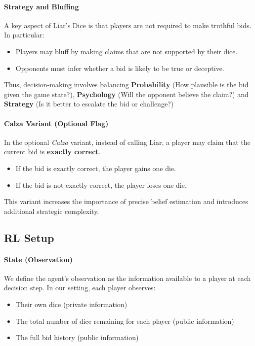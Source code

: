 \documentclass{article}
\begin{document}
\paragraph{Strategy and Bluffing}

A key aspect of Liar’s Dice is that players are not required to make truthful bids. In particular:
\begin{itemize}
    \item Players may bluff by making claims that are not supported by their dice.
    \item Opponents must infer whether a bid is likely to be true or deceptive.
\end{itemize}

Thus, decision-making involves balancing \textbf{Probability} (How plausible is the bid given the game state?), \textbf{Psychology} (Will the opponent believe the claim?) and \textbf{Strategy} (Is it better to escalate the bid or challenge?)

\paragraph{Calza Variant (Optional Flag)}

In the optional \textit{Calza} variant, instead of calling Liar, a player may claim that the current bid is \textbf{exactly correct}.

\begin{itemize}
    \item If the bid is exactly correct, the player gains one die.
    \item If the bid is not exactly correct, the player loses one die.
\end{itemize}

This variant increases the importance of precise belief estimation and introduces additional strategic complexity.

\subsection{RL Setup}

\paragraph{State (Observation)}
We define the agent's observation as the information available to a player at each decision step. In our setting, each player observes:
\begin{itemize}
    \item Their own dice (private information)
    \item The total number of dice remaining for each player (public information)
    \item The full bid history (public information)
\end{itemize}
\end{document}
